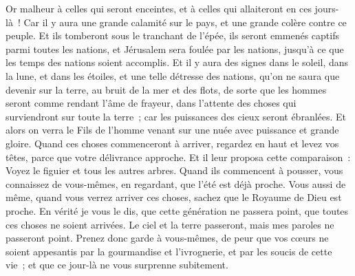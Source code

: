\begin{multicols}{2}
Or malheur à celles qui seront enceintes, et à celles qui allaiteront en ces jours-là~! Car il y aura une grande calamité sur le pays, et une grande colère contre ce peuple.
Et ils tomberont sous le tranchant de l'épée, ils seront emmenés captifs parmi toutes les nations, et Jérusalem sera foulée par les nations, jusqu'à ce que les temps des nations soient accomplis.
Et il y aura des signes dans le soleil, dans la lune, et dans les étoiles, et une telle détresse des nations, qu'on ne saura que devenir sur la terre, au bruit de la mer et des flots,
de sorte que les hommes seront comme rendant l'âme de frayeur, dans l'attente des choses qui surviendront sur toute la terre~; car les puissances des cieux seront ébranlées.
Et alors on verra le Fils de l'homme venant sur une nuée avec puissance et grande gloire.
Quand ces choses commenceront à arriver, regardez en haut et levez vos têtes, parce que votre délivrance approche.
Et il leur proposa cette comparaison~: Voyez le figuier et tous les autres arbres.
Quand ils commencent à pousser, vous connaissez de vous-mêmes, en regardant, que l'été est déjà proche.
Vous aussi de même, quand vous verrez arriver ces choses, sachez que le Royaume de Dieu est proche.
En vérité je vous le dis, que cette génération ne passera point, que toutes ces choses ne soient arrivées.
Le ciel et la terre passeront, mais mes paroles ne passeront point.
Prenez donc garde à vous-mêmes, de peur que vos cœurs ne soient appesantis par la gourmandise et l'ivrognerie, et par les soucis de cette vie~; et que ce jour-là ne vous surprenne subitement.

\end{multicols}
